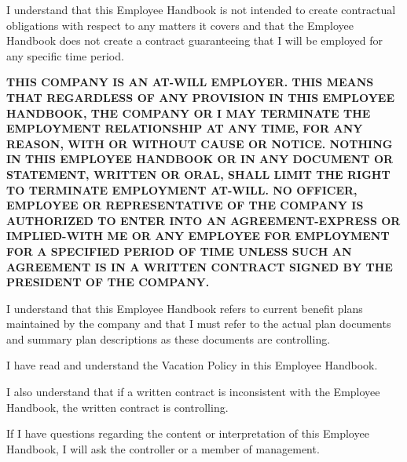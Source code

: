 \documentclass{book}
\begin{document}
I understand that this Employee Handbook is not intended to create contractual obligations with respect to any matters it covers and that the Employee Handbook does not create a contract guaranteeing that I will be employed for any specific time period. 

\newpage

\textbf{THIS COMPANY IS AN AT-WILL EMPLOYER. THIS MEANS THAT REGARDLESS OF ANY PROVISION IN THIS EMPLOYEE HANDBOOK, THE COMPANY OR I MAY TERMINATE THE EMPLOYMENT RELATIONSHIP AT ANY TIME, FOR ANY REASON, WITH OR WITHOUT CAUSE OR NOTICE. NOTHING IN THIS EMPLOYEE HANDBOOK OR IN ANY DOCUMENT OR STATEMENT, WRITTEN OR ORAL, SHALL LIMIT THE RIGHT TO TERMINATE EMPLOYMENT AT-WILL. NO OFFICER, EMPLOYEE OR REPRESENTATIVE OF THE COMPANY IS AUTHORIZED TO ENTER INTO AN AGREEMENT-EXPRESS OR IMPLIED-WITH ME OR ANY EMPLOYEE FOR EMPLOYMENT FOR A SPECIFIED PERIOD OF TIME UNLESS SUCH AN AGREEMENT IS IN A WRITTEN CONTRACT SIGNED BY THE PRESIDENT OF THE COMPANY.}

I understand that this Employee Handbook refers to current benefit plans maintained by the company and that I must refer to the actual plan documents and summary plan descriptions as these documents are controlling. 

I have read and understand the Vacation Policy in this Employee Handbook.

\begin{center}
\end{center}

I also understand that if a written contract is inconsistent with the Employee Handbook, the written contract is controlling.

\newpage

If I have questions regarding the content or interpretation of this Employee Handbook, I will ask the controller or a member of management.

\vspace{2em}


\vspace{2em}


\vspace{2em}


\pagebreak

\printindex
\end{document}
